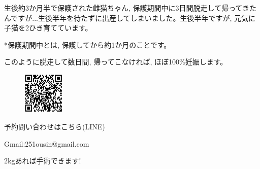 \documentclass{jsarticle}
\begin{document}
\Large
  生後約3か月半で保護された雌猫ちゃん, 保護期間中に3日間脱走して帰ってきたんですが...生後半年を待たずに出産してしまいました。生後半年ですが, 元気に子猫を2ひき育てています。

  *保護期間中とは, 保護してから約1か月のことです。

	このように脱走して数日間, 帰ってこなければ, ほぼ100\%妊娠します。

	\vspace{50pt}
	\begin{figure}
		\vspace*{-\intextsep}
		\includegraphics[width=2cm]{qr.jpg}
	\end{figure}
	予約問い合わせはこちら(LINE)

	Gmail:251ousin@gmail.com




\newpage
\huge
  2\si{\kilogram}あれば手術できます!
\end{document}
